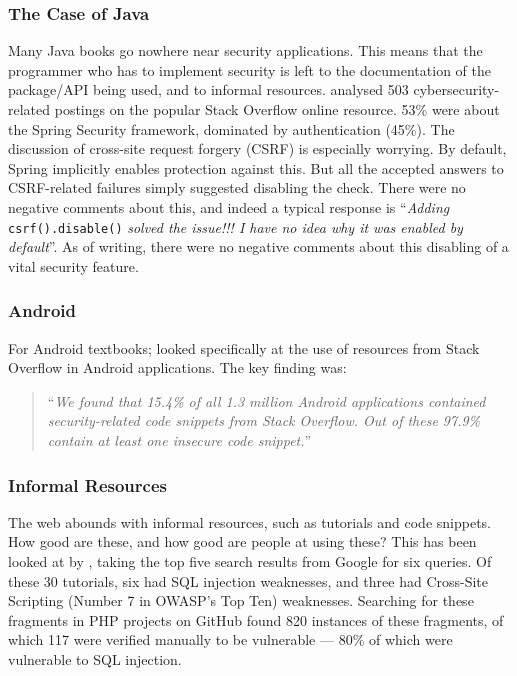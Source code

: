 \documentclass[a4paper,11pt]{article}
\begin{document}
\subsubsection*{The Case of Java}\label{sec:Java}

Many Java books go nowhere near security applications.  This means that the programmer who has to implement security is left to the documentation of the package/API being used, and to informal resources. \cite{Mengetal2018a} analysed 503 cybersecurity-related postings on the popular Stack Overflow online resource. 53\% were about the Spring Security framework, dominated by authentication (45\%). The discussion \cite[\S4.3.1]{Mengetal2018a} of cross-site request forgery (CSRF) is especially worrying.  By default, Spring implicitly enables protection against this. But all the accepted answers to CSRF-related failures simply suggested disabling the check. There were no negative comments about this, and indeed a typical response is ``{\emph{Adding}} \verb!csrf().disable()!
{\emph{{solved the issue!!! I have no idea why it was enabled by default}}''. As of writing, there were no negative comments about this disabling of a vital security feature.}

\subsubsection*{Android}\label{sec:Android}

For Android textbooks; \cite{Fischeretal2017a} looked specifically at the use of resources from Stack Overflow in Android applications. The key finding was:

\begin{quote}
``{\emph{We found that 15.4\% of all 1.3 million Android applications
contained security-related code snippets from
Stack Overflow. Out of these 97.9\% contain at least one
insecure code snippet.}}''
\end{quote}

\subsubsection*{Informal Resources}\label{sec:informal}

The web abounds with informal resources, such as tutorials and code snippets. How good are these, and how good are people at using these? This has been looked at by \cite{Unruhetal2017a}, taking the top five search results from Google for six queries. Of these 30 tutorials, six had SQL injection weaknesses, and three had Cross-Site Scripting (Number 7 in OWASP's Top Ten) weaknesses. Searching for these fragments in PHP projects on GitHub found 820 instances of these fragments, of which 117 were verified manually to be vulnerable --- 80\% of which were vulnerable to SQL injection. 
\end{document}
